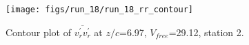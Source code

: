 \begin{figure}[H]
\centering
\texttt{[image: figs/run\_18/run\_18\_rr\_contour]}
\caption{Contour plot of $\overline{v_{r}^{\prime} v_{r}^{\prime}}$ at $z/c$=6.97, $V_{free}$=29.12, station 2.}
\label{fig:run_18_rr_contour}
\end{figure}


